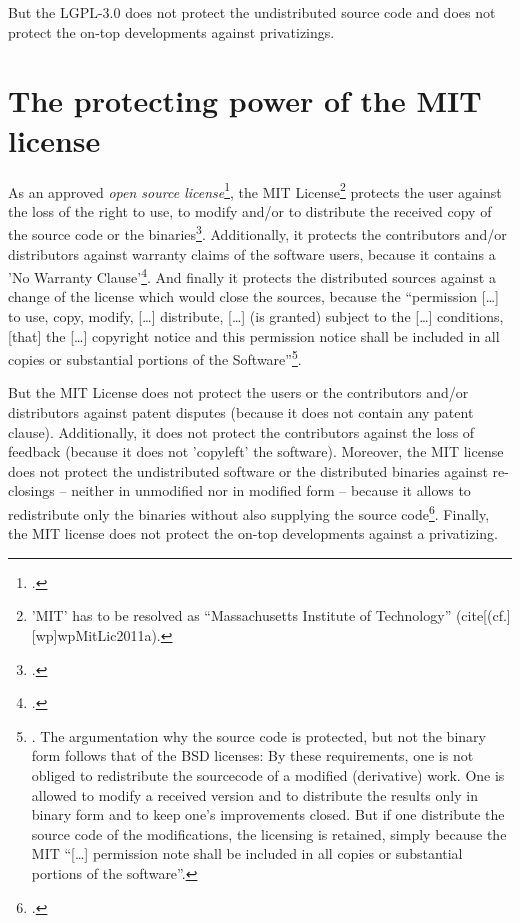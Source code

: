 But the LGPL-3.0 does not protect the undistributed source code and does not
protect the on-top developments against privatizings.

\section{The protecting power of the MIT license}
\label{sec:ProtectingPowerOfMit}

As an approved \emph{open source license}\footcite[cf.][\nopage wp]{OSI2012b},
the MIT License\footnote{'MIT' has to be resolved as \enquote{Massachusetts
Institute of Technology} (cite[(cf.][\nopage wp]{wpMitLic2011a}).} protects the
user against the loss of the right to use, to modify and/or to distribute the
received copy of the source code or the binaries\footcite[cf.][\nopage wp
1ff]{OSI2012a}. Additionally, it protects the contributors and/or distributors
against warranty claims of the software users, because it contains a 'No
Warranty Clause'\footcite[cf.][\nopage wp]{MitLicense2012a}. And finally it
protects the distributed sources against a change of the license which would
close the sources, because the \enquote{permission [\ldots] to use, copy,
modify, [\ldots] distribute, [\ldots] (is granted) subject to the [\ldots]
conditions, [that] the [\ldots] copyright notice and this permission notice
shall be included in all copies or substantial portions of the
Software}\footnote{\cite[cf.][\nopage wp]{MitLicense2012a}. The argumentation
why the source code is protected, but not the binary form follows that of the
BSD licenses: By these requirements, one is not obliged to redistribute the
sourcecode of a modified (derivative) work. One is allowed to modify a received
version and to distribute the results only in binary form and to keep one's
improvements closed. But if one distribute the source code of the modifications,
the licensing is retained, simply because the MIT \enquote{[\ldots] permission
note shall be included in all copies or substantial portions of the software}.}.

But the MIT License does not protect the users or the contributors and/or
distributors against patent disputes (because it does not contain any patent
clause). Additionally, it does not protect the contributors against the loss of
feedback (because it does not 'copyleft' the software). Moreover, the MIT
license does not protect the undistributed software or the distributed binaries
against re-closings -- neither in unmodified nor in modified form -- because it
allows to redistribute only the binaries without also supplying the source
code\footcite[cf.][\nopage wp]{MitLicense2012a}. Finally, the MIT license does
not protect the on-top developments against a privatizing.

